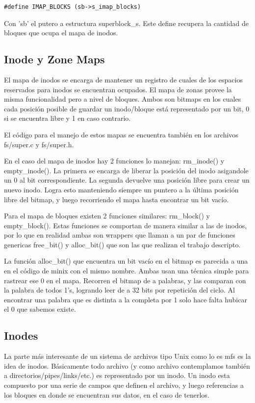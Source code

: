 \begin{verbatim}
#define IMAP_BLOCKS (sb->s_imap_blocks)
\end{verbatim}

Con 'sb' el putero a estructura superblock\_s. Este define recupera la cantidad
de bloques que ocupa el mapa de inodos.

\subsection{Inode y Zone Maps}

El mapa de inodos se encarga de mantener un registro de cuales de los espacios
reservados para inodos se encuentran ocupados. El mapa de zonas provee la misma
funcionalidad pero a nivel de bloques. Ambos son bitmaps en los cuales cada
posición posible de guardar un inodo/bloque está representado por un bit, 0 si
se encuentra libre y 1 en caso contrario.

El código para el manejo de estos mapas se encuentra también en los archivos
fs/super.c y fs/super.h.

En el caso del mapa de inodos hay 2 funciones lo manejan: rm\_inode() y
empty\_inode(). La primera se encarga de liberar la posición del inodo
asigandole un 0 al bit correspondiente. La segunda devuelve una posición libre
para crear un nuevo inodo. Logra esto manteniendo siempre un puntero a la última
posición libre del bitmap, y luego recorriendo el mapa hasta encontrar un bit
vacío.

Para el mapa de bloques existen 2 funciones similares: rm\_block() y
empty\_block(). Estas funciones se comportan de manera similar a las de inodos,
por lo que en realidad ambas son wrappers que llaman a un par de funciones
genericas free\_bit() y alloc\_bit() que son las que realizan el trabajo
descripto.

La función alloc\_bit() que encuentra un bit vacío en el bitmap es parecida a
una en el código de minix con el mismo nombre. Ambas usan una técnica simple
para rastrear ese 0 en el mapa. Recorren el bitmap de a palabras, y las comparan
con la palabra de todos 1's, logrando leer de a 32 bits por repetición del
ciclo. Al encontrar una palabra que es distinta a la completa por 1 solo hace
falta hubicar el 0 que sabemos existe.

\subsection{Inodes}

La parte más interesante de un sistema de archivos tipo Unix como lo es mfs es
la idea de inodos. Básicamente todo archivo (y como archivo contemplamos también
a directorios/pipes/links/etc.) es representado por un inodo. Un inodo esta
compuesto por una serie de campos que definen el archivo, y luego referencias a
los bloques en donde se encuentran sus datos, en el caso de tenerlos.

